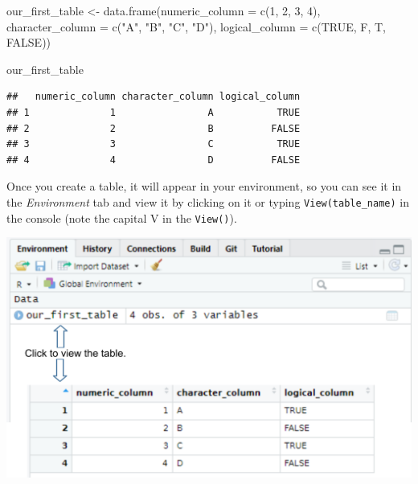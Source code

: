\documentclass[
]{book}
\newenvironment{Shaded}{\begin{snugshade}}{\end{snugshade}}
\newcommand{\AttributeTok}[1]{\textcolor[rgb]{0.77,0.63,0.00}{#1}}
\newcommand{\ConstantTok}[1]{\textcolor[rgb]{0.00,0.00,0.00}{#1}}
\newcommand{\DecValTok}[1]{\textcolor[rgb]{0.00,0.00,0.81}{#1}}
\newcommand{\FunctionTok}[1]{\textcolor[rgb]{0.00,0.00,0.00}{#1}}
\newcommand{\NormalTok}[1]{#1}
\newcommand{\OtherTok}[1]{\textcolor[rgb]{0.56,0.35,0.01}{#1}}
\newcommand{\StringTok}[1]{\textcolor[rgb]{0.31,0.60,0.02}{#1}}
\begin{document}
\begin{Shaded}
\begin{Highlighting}[]
\NormalTok{our\_first\_table }\OtherTok{\textless{}{-}} \FunctionTok{data.frame}\NormalTok{(}\AttributeTok{numeric\_column =} \FunctionTok{c}\NormalTok{(}\DecValTok{1}\NormalTok{, }\DecValTok{2}\NormalTok{, }\DecValTok{3}\NormalTok{, }\DecValTok{4}\NormalTok{), }
                              \AttributeTok{character\_column =} \FunctionTok{c}\NormalTok{(}\StringTok{"A"}\NormalTok{, }\StringTok{"B"}\NormalTok{, }\StringTok{"C"}\NormalTok{, }\StringTok{"D"}\NormalTok{),}
                              \AttributeTok{logical\_column =} \FunctionTok{c}\NormalTok{(}\ConstantTok{TRUE}\NormalTok{, F, T, }\ConstantTok{FALSE}\NormalTok{))}

\NormalTok{our\_first\_table}
\end{Highlighting}
\end{Shaded}

\begin{verbatim}
##   numeric_column character_column logical_column
## 1              1                A           TRUE
## 2              2                B          FALSE
## 3              3                C           TRUE
## 4              4                D          FALSE
\end{verbatim}

Once you create a table, it will appear in your environment, so you can see it in the \emph{Environment} tab and view it by clicking on it or typing \texttt{View(table\_name)} in the console (note the capital V in the \texttt{View()}).

\begin{center}\includegraphics[width=1\linewidth]{images/viewing-table} \end{center}
\end{document}
